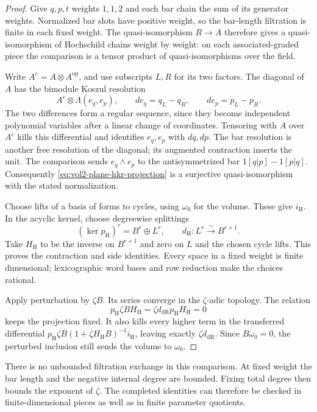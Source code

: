 \begin{proof}
Give $q,p,t$ weights $1,1,2$ and each bar chain the sum of its
generator weights. Normalized bar slots have positive weight, so
the bar-length filtration is finite in each fixed weight.
The quasi-isomorphism $R\to A$ therefore gives a
quasi-isomorphism of Hochschild chains weight by weight:
on each associated-graded piece the comparison is a tensor
product of quasi-isomorphisms over the field.

Write $A^e=A\otimes A^{\mathrm{op}}$, and use subscripts $L,R$
for its two factors. The diagonal of $A$ has the bimodule
Koszul resolution
\[
 A^e\otimes\Lambda(e_q,e_p),\qquad
 de_q=q_L-q_R,\qquad de_p=p_L-p_R.
\]
The two differences form a regular sequence, since they become
independent polynomial variables after a linear change of
coordinates. Tensoring with $A$ over $A^e$ kills this
differential and identifies $e_q,e_p$ with $dq,dp$.
The bar resolution is another free resolution of the diagonal;
its augmented contraction inserts the unit. The comparison sends
$e_q\wedge e_p$ to the antisymmetrized bar
$1[q|p]-1[p|q]$. Consequently
\eqref{eq:vol2-plane-hkr-projection} is a surjective
quasi-isomorphism with the stated normalization.

Choose lifts of a basis of forms to cycles, using $\omega_0$
for the volume. These give $i_{\mathrm H}$. In the acyclic
kernel, choose degreewise splittings
\[
 (\ker p_{\mathrm H})^r=B^r\oplus L^r,
 \qquad d_{\mathrm H}:L^r\xrightarrow{\sim}B^{r+1}.
\]
Take $H_{\mathrm H}$ to be the inverse on $B^{r+1}$ and zero
on $L$ and the chosen cycle lifts. This proves the contraction
and side identities. Every space in a fixed weight is finite
dimensional; lexicographic word bases and row reduction make
the choices rational.

Apply perturbation by $\zeta B$. Its series converge in the
$\zeta$-adic topology. The relation
\[
 p_{\mathrm H}\zeta BH_{\mathrm H}
      =\zeta d_{\mathrm{dR}}p_{\mathrm H}H_{\mathrm H}=0
\]
keeps the projection fixed. It also kills every higher term
in the transferred differential
$p_{\mathrm H}\zeta B(1+\zeta H_{\mathrm H}B)^{-1}i_{\mathrm H}$,
leaving exactly $\zeta d_{\mathrm{dR}}$.
Since $B\omega_0=0$, the perturbed inclusion still sends the
volume to $\omega_0$.
\end{proof}

There is no unbounded filtration exchange in this comparison.
At fixed weight the bar length and the negative internal degree
are bounded. Fixing total degree then bounds the exponent of
$\zeta$. The completed identities can therefore be checked in
finite-dimensional pieces as well as in finite parameter quotients.

